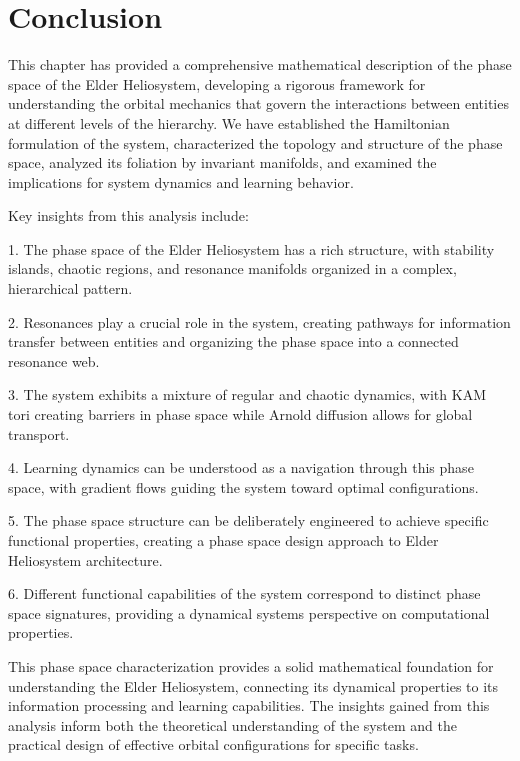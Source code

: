 \section{Conclusion}

This chapter has provided a comprehensive mathematical description of the phase space of the Elder Heliosystem, developing a rigorous framework for understanding the orbital mechanics that govern the interactions between entities at different levels of the hierarchy. We have established the Hamiltonian formulation of the system, characterized the topology and structure of the phase space, analyzed its foliation by invariant manifolds, and examined the implications for system dynamics and learning behavior.

Key insights from this analysis include:

1. The phase space of the Elder Heliosystem has a rich structure, with stability islands, chaotic regions, and resonance manifolds organized in a complex, hierarchical pattern.

2. Resonances play a crucial role in the system, creating pathways for information transfer between entities and organizing the phase space into a connected resonance web.

3. The system exhibits a mixture of regular and chaotic dynamics, with KAM tori creating barriers in phase space while Arnold diffusion allows for global transport.

4. Learning dynamics can be understood as a navigation through this phase space, with gradient flows guiding the system toward optimal configurations.

5. The phase space structure can be deliberately engineered to achieve specific functional properties, creating a phase space design approach to Elder Heliosystem architecture.

6. Different functional capabilities of the system correspond to distinct phase space signatures, providing a dynamical systems perspective on computational properties.

This phase space characterization provides a solid mathematical foundation for understanding the Elder Heliosystem, connecting its dynamical properties to its information processing and learning capabilities. The insights gained from this analysis inform both the theoretical understanding of the system and the practical design of effective orbital configurations for specific tasks.